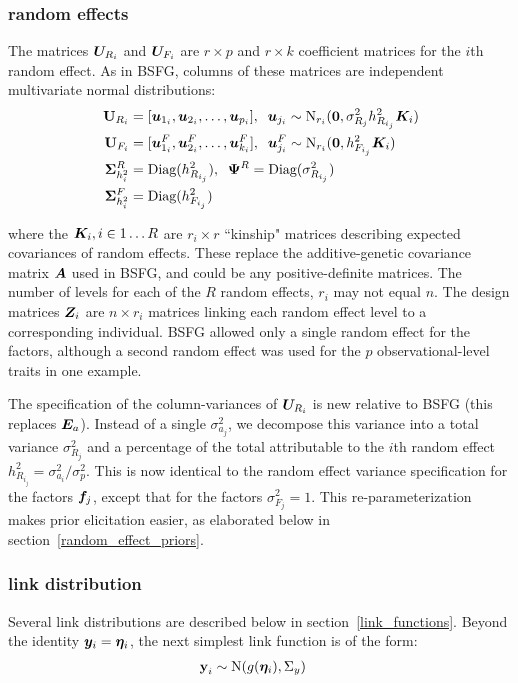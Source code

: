 \documentclass[11pt]{amsart}
\newcommand*{\B}[1]{\ifmmode\bm{#1}\else\textbf{#1}\fi}
\begin{document}
\subsubsection{random effects}
The matrices $\B{U}_{R_i}$ and $\B{U}_{F_i}$ are $r \times p$ and $r \times k$ coefficient matrices for the $i$th random effect. As in BSFG, columns of these matrices are independent multivariate normal distributions:
\begin{align} \begin{split}
\B{U}_{R_i} &= [\B{u}_{1_i}, \B{u}_{2_i},\dots,\B{u}_{p_i}],\;\; \B{u}_{j_i} \sim \mbox{N}_{r_i}(\B{0},\sigma^2_{R_j}h^2_{R_{i_j}}\B{K}_i) \\
\B{U}_{F_i} &=  [\B{u}^F_{1_i}, \B{u}^F_{2_i},\dots,\B{u}^F_{k_i}],\;\; \B{u}^F_{j_i} \sim \mbox{N}_{r_i}(\B{0},h^2_{F_{i_j}}\B{K}_i)\\
\;\B{\Sigma}^R_{h^2_i} &= \mbox{Diag}(h^2_{R_{i_j}}),\;\;\B{\Psi}^R = \mbox{Diag}(\sigma^2_{R_{i_j}}) \\
\;\B{\Sigma}^F_{h^2_i} &= \mbox{Diag}(h^2_{F_{i_j}})
\end{split} \end{align}

\noindent where the $\B{K}_i, i \in 1\dots R$ are $r_i \times r$ ``kinship" matrices describing expected covariances of random effects. These replace the additive-genetic covariance matrix $\B{A}$ used in BSFG, and could be any positive-definite matrices. The number of levels for each of the $R$ random effects, $r_i$ may not equal $n$. The design matrices $\B{Z}_i$ are $n \times r_i$ matrices linking each random effect level to a corresponding individual. BSFG allowed only a single random effect for the factors, although a second random effect was used for the $p$ observational-level traits in one example. 

The specification of the column-variances of $\B{U}_{R_i}$ is new relative to BSFG (this replaces $\B{E}_a$). Instead of a single $\sigma^2_{a_j}$, we decompose this variance into a total variance $\sigma^2_{R_j}$ and a percentage of the total attributable to the $i$th random effect $h^2_{R_{i_j}} = \sigma^2_{a_i}/\sigma^2_p$. This is now identical to the random effect variance specification for the factors $\B{f}_j$, except that for the factors $\sigma^2_{F_j} = 1$. This re-parameterization makes prior elicitation easier, as elaborated below in section~\ref{random_effect_priors}.

\subsubsection{link distribution}
Several link distributions are described below in section~\ref{link_functions}. 
Beyond the identity $\B{y}_i = \B{\eta}_i$, the next simplest link function is of the form:
\begin{align}
\B{y}_i &\sim \mbox{N}(g(\B{\eta}_i),\Sigma_y)
\end{align}
\end{document}
